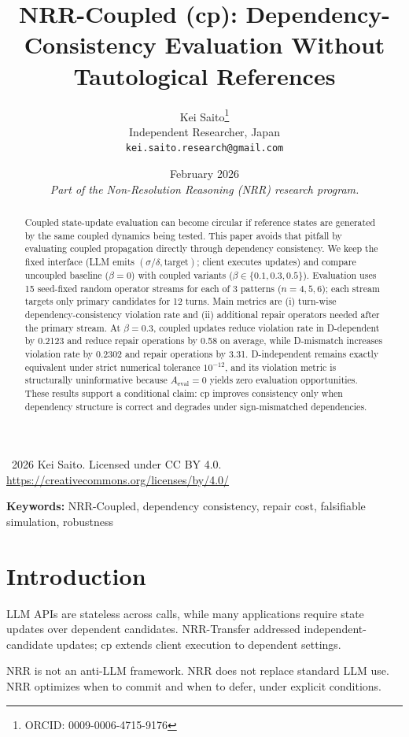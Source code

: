 \documentclass[11pt,a4paper]{article}
\title{\textbf{NRR-Coupled (cp): Dependency-Consistency Evaluation Without Tautological References}}
\author{Kei Saito\thanks{ORCID: 0009-0006-4715-9176}\\Independent Researcher, Japan\\\texttt{kei.saito.research@gmail.com}}
\date{February 2026\\[0.5em]\textit{Part of the Non-Resolution Reasoning (NRR) research program.}}
\begin{document}
\maketitle

\begin{center}
\textcopyright\ 2026 Kei Saito. Licensed under CC BY 4.0.\\
\url{https://creativecommons.org/licenses/by/4.0/}
\end{center}

\begin{abstract}
Coupled state-update evaluation can become circular if reference states are generated by the same coupled dynamics being tested. This paper avoids that pitfall by evaluating coupled propagation directly through dependency consistency. We keep the fixed interface (LLM emits \((\sigma/\delta,\text{target})\); client executes updates) and compare uncoupled baseline (\(\beta=0\)) with coupled variants (\(\beta\in\{0.1,0.3,0.5\}\)). Evaluation uses 15 seed-fixed random operator streams for each of 3 patterns (\(n=4,5,6\)); each stream targets only primary candidates for 12 turns. Main metrics are (i) turn-wise dependency-consistency violation rate and (ii) additional repair operators needed after the primary stream. At \(\beta=0.3\), coupled updates reduce violation rate in D-dependent by 0.2123 and reduce repair operations by 0.58 on average, while D-mismatch increases violation rate by 0.2302 and repair operations by 3.31. D-independent remains exactly equivalent under strict numerical tolerance \(10^{-12}\), and its violation metric is structurally uninformative because \(A_{\text{eval}}=0\) yields zero evaluation opportunities. These results support a conditional claim: cp improves consistency only when dependency structure is correct and degrades under sign-mismatched dependencies.
\end{abstract}

\noindent\textbf{Keywords:} NRR-Coupled, dependency consistency, repair cost, falsifiable simulation, robustness

\section{Introduction}
LLM APIs are stateless across calls, while many applications require state updates over dependent candidates. NRR-Transfer addressed independent-candidate updates; cp extends client execution to dependent settings.

NRR is not an anti-LLM framework.
NRR does not replace standard LLM use.
NRR optimizes when to commit and when to defer, under explicit conditions.
\end{document}
